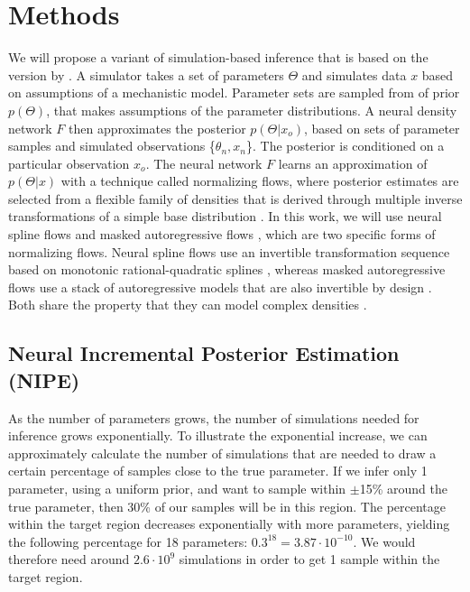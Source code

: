\documentclass[12pt]{extreport}
\begin{document}
\chapter{Methods}

We will propose a variant of simulation-based inference that is based on the version by \cite{greenberg_automatic_2019}. A simulator takes a set of parameters $\Theta$ and simulates data $x$ based on assumptions of a mechanistic model. Parameter sets are sampled from of prior $p(\Theta)$, that makes assumptions of the parameter distributions. A neural density network $F$ then approximates the posterior $p(\Theta|x_o)$, based on sets of parameter samples and simulated observations \{$\theta_n, x_n$\}. The posterior is conditioned on a particular observation $x_o$. The neural network $F$ learns an approximation of $p(\Theta|x)$ with a technique called normalizing flows, where posterior estimates are selected from a flexible family of densities that is derived through multiple inverse transformations of a simple base distribution \citep{cranmer2020frontier, greenberg_automatic_2019}. In this work, we will use neural spline flows \citep{durkan2019neural} and masked autoregressive flows \citep{papamakarios2017masked}, which are two specific forms of normalizing flows. Neural spline flows use an invertible transformation sequence based on monotonic rational-quadratic splines \citep{durkan2019neural}, whereas masked autoregressive flows use a stack of autoregressive models that are also invertible by design \citep{papamakarios2017masked}. Both share the property that they can model complex densities \citep{durkan2019neural, papamakarios2017masked}.

\section{Neural Incremental Posterior Estimation (NIPE)}
\label{sec:nipe}


As the number of parameters grows, the number of simulations needed for inference grows exponentially. To illustrate the exponential increase, we can approximately calculate the number of simulations that are needed to draw a certain percentage of samples close to the true parameter. If we infer only 1 parameter, using a uniform prior, and want to sample within $\pm$15\% around the true parameter, then 30\% of our samples will be in this region. 
The percentage within the target region decreases exponentially with more parameters, yielding the following percentage for 18 parameters: $0.3^{18}= 3.87 \cdot 10^{-10}$. We would therefore need around $2.6 \cdot 10^{9}$ simulations in order to get 1 sample within the target region.\\
\end{document}

